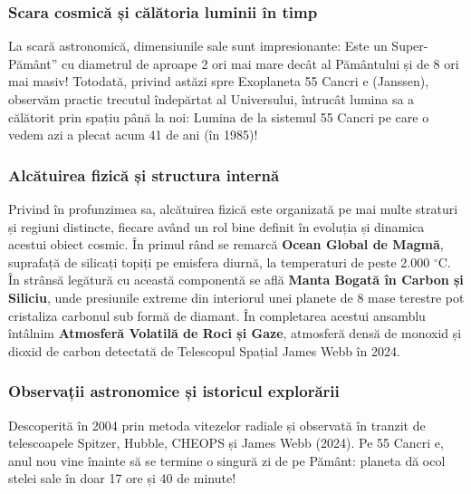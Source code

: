 \subsubsection*{Scara cosmică și călătoria luminii în timp}
La scară astronomică, dimensiunile sale sunt impresionante: Este un \quotedblbase{}Super-Pământ\textquotedblright{} cu diametrul de aproape 2 ori mai mare decât al Pământului și de 8 ori mai masiv! Totodată, privind astăzi spre Exoplaneta 55 Cancri e (Janssen), observăm practic trecutul îndepărtat al Universului, întrucât lumina sa a călătorit prin spațiu până la noi: Lumina de la sistemul 55 Cancri pe care o vedem azi a plecat acum 41 de ani (în 1985)!

\subsubsection*{Alcătuirea fizică și structura internă}
Privind în profunzimea sa, alcătuirea fizică este organizată pe mai multe straturi și regiuni distincte, fiecare având un rol bine definit în evoluția și dinamica acestui obiect cosmic. În primul rând se remarcă \textbf{Ocean Global de Magmă}, suprafață de silicați topiți pe emisfera diurnă, la temperaturi de peste 2.000 $^\circ$C. În strânsă legătură cu această componentă se află \textbf{Manta Bogată în Carbon și Siliciu}, unde presiunile extreme din interiorul unei planete de 8 mase terestre pot cristaliza carbonul sub formă de diamant. În completarea acestui ansamblu întâlnim \textbf{Atmosferă Volatilă de Roci și Gaze}, atmosferă densă de monoxid și dioxid de carbon detectată de Telescopul Spațial James Webb în 2024.

\subsubsection*{Observații astronomice și istoricul explorării}
Descoperită în 2004 prin metoda vitezelor radiale și observată în tranzit de telescoapele Spitzer, Hubble, CHEOPS și James Webb (2024). Pe 55 Cancri e, anul nou vine înainte să se termine o singură zi de pe Pământ: planeta dă ocol stelei sale în doar 17 ore și 40 de minute!

